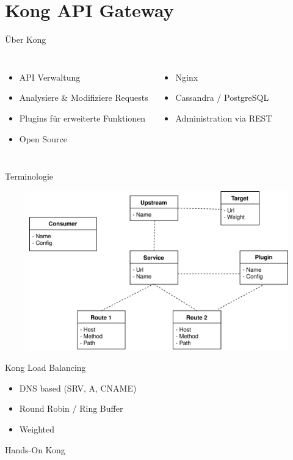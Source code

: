 \section{Kong API Gateway}


\begin{frame}{Über Kong}
\begin{columns}
		\begin{itemize}
		\item API Verwaltung
		\item Analysiere \& Modifiziere Requests
		\item Plugins für erweiterte Funktionen
		\item Open Source
	\end{itemize}

	\begin{itemize}
		\item Nginx
		\item Cassandra / PostgreSQL
		\item Administration via REST
	\end{itemize}
\end{columns}
\end{frame}

\begin{frame}{Terminologie}
	\begin{figure}
		\centering
		\includegraphics[width=0.75\linewidth]{img/kong_overview}
	\end{figure}
\end{frame}

\begin{frame}{Kong Load Balancing}
	\begin{itemize}
		\item DNS based (SRV, A, CNAME)
		\item Round Robin / Ring Buffer
		\item Weighted
	\end{itemize}
\end{frame}

\begin{frame}[standout]
	Hands-On Kong
\end{frame}



